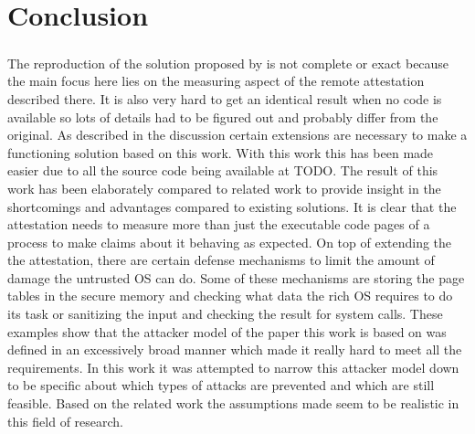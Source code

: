 \chapter{Conclusion}

\paragraph*{}
The reproduction of the solution proposed by \cite{LingZhen2021Sbtb} is not complete or exact because the main focus here lies on the measuring aspect of the remote attestation described there. It is also very hard to get an identical result when no code is available so lots of details had to be figured out and probably differ from the original. As described in the discussion certain extensions are necessary to make a functioning solution based on this work. With this work this has been made easier due to all the source code being available at TODO. The result of this work has been elaborately compared to related work to provide insight in the shortcomings and advantages compared to existing solutions. It is clear that the attestation needs to measure more than just the executable code pages of a process to make claims about it behaving as expected. On top of extending the the attestation, there are certain defense mechanisms to limit the amount of damage the untrusted OS can do. Some of these mechanisms are storing the page tables in the secure memory and checking what data the rich OS requires to do its task or sanitizing the input and checking the result for system calls. These examples show that the attacker model of the paper this work is based on was defined in an excessively broad manner which made it really hard to meet all the requirements. In this work it was attempted to narrow this attacker model down to be specific about which types of attacks are prevented and which are still feasible. Based on the related work the assumptions made seem to be realistic in this field of research.